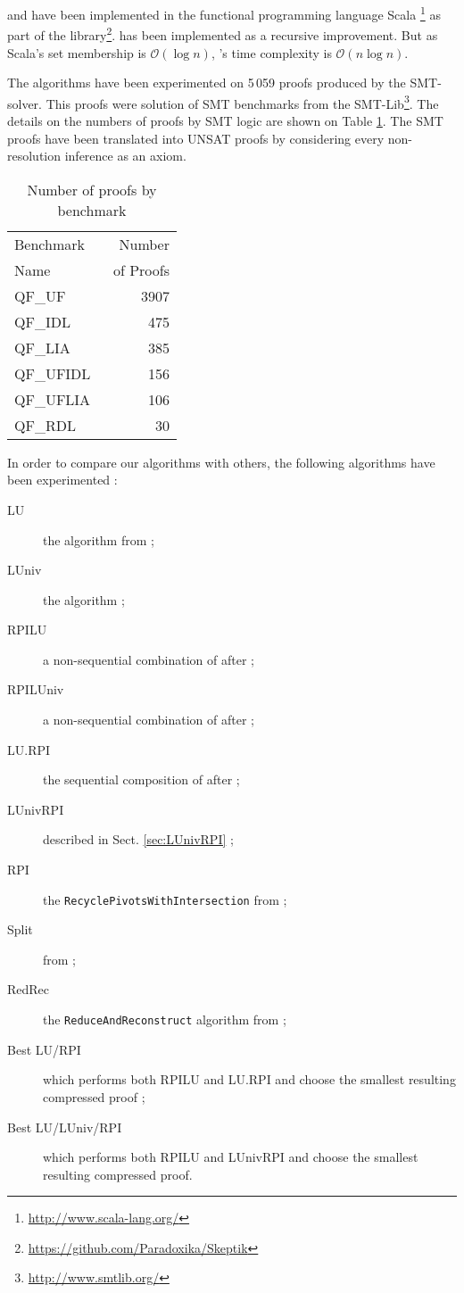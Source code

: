 \documentclass{llncs}
\begin{document}
{\LowerUnivalents} and {\LUnivRPI} have been implemented in the functional programming
language Scala \footnote{\url{http://www.scala-lang.org/}} as part of the \skeptik
library\footnote{\url{https://github.com/Paradoxika/Skeptik}}. {\LowerUnivalents} has been implemented as a
recursive  improvement. But as Scala's set membership is $\mathcal{O}(\log{n})$,
{\LowerUnivalents}'s time complexity is $\mathcal{O}(n \log{n})$.

The algorithms have been experimented on 5\,059 proofs produced by the {\veriT} SMT-solver. This
proofs were solution of SMT benchmarks from the SMT-Lib\footnote{\url{http://www.smtlib.org/}}.
The details on the numbers of proofs by SMT logic are shown on Table \ref{tab:benchmarks}.  The SMT
proofs have been translated into UNSAT proofs by considering every non-resolution inference as an
axiom.

\begin{table}[tb]
  \caption{Number of proofs by benchmark}
  \label{tab:benchmarks}
  \centering
  \begin{tabular}{lr}
    \toprule
    Benchmark~ &  Number \\
    Name       & ~of Proofs \\
    \midrule
    QF\_UF      & 3907 \\
    QF\_IDL     &  475 \\
    QF\_LIA     &  385 \\
    QF\_UFIDL   &  156 \\
    QF\_UFLIA   &  106 \\
    QF\_RDL     &   30 \\
    \bottomrule
  \end{tabular}
\end{table}

In order to compare our algorithms with others, the following algorithms have been experimented :
\begin{description}
  \item[LU] the {\LowerUnits} algorithm from \cite{LURPI} ;
  \item[LUniv] the {\LowerUnivalents} algorithm ;
  \item[RPILU] a non-sequential combination of {\RPI} after {\LowerUnits} ;
  \item[RPILUniv] a non-sequential combination of {\RPI} after {\LowerUnivalents} ;
  \item[LU.RPI] the sequential composition of {\LowerUnits} after {\RPI} ;
  \item[LUnivRPI] described in Sect. \ref{sec:LUnivRPI} ;
  \item[RPI] the \texttt{RecyclePivotsWithIntersection} from \cite{LURPI} ;
  \item[Split] from \cite{CottonSplit} ;
  \item[RedRec] the \texttt{ReduceAndReconstruct} algorithm from \cite{RedRec} ;
  \item[Best LU/RPI] which performs both RPILU and LU.RPI and choose the smallest resulting
    compressed proof ;
  \item[Best LU/LUniv/RPI] which performs both RPILU and LUnivRPI and choose the smallest resulting
    compressed proof.
\end{description}
\end{document}
